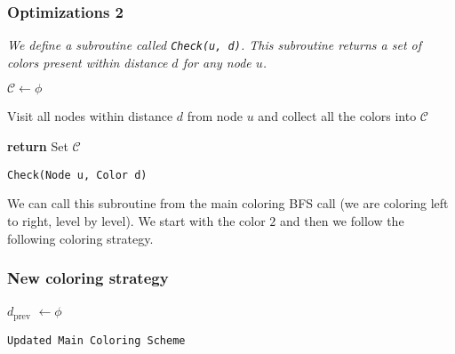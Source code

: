 \begin{frame}
    \frametitle{Optimizations 2}
    \textit{We define a subroutine called \texttt{Check(u, d)}. This subroutine returns a set of colors present within distance $d$ for any node $u$.}
    \pause[]
    \begin{algorithm}[H]\label{alg:11}
        $\mathcal{C} \gets \phi$\;
    
        Visit all nodes within distance $d$ from node $u$ and collect all the colors into $\mathcal{C}$\;
    
        \textbf{return} Set $\mathcal{C}$\;
        
        \caption{\texttt{Check(Node u, Color d)}}
    \end{algorithm}


    \pause[]
    We can call this subroutine from the main coloring BFS call (we are coloring left to right, level by level). We start with the color $2$ and then we follow the following coloring strategy.
\end{frame}

\begin{frame}
    \frametitle{New coloring strategy}

    \begin{algorithm}[H]
         {
            $d_{\text{prev}}$ $\gets \phi$\;
             {
    
    
                \Else {
                    
                }
            }
        }
        \caption{\texttt{Updated Main Coloring Scheme}}
    \end{algorithm}

\end{frame}


